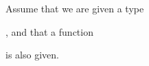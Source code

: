 \documentclass{article}
\begin{document}
Assume that we are given a type
%
\begin{code}[inline=False,hide=true]%
%
\>[2]\AgdaSpace{}%
\AgdaModule{\AgdaUnderscore{}}\AgdaSpace{}%
\AgdaSymbol{(}\<%
\end{code}
\begin{code}[hide,inline,hide=false]%
\>[2][@{}l@{\AgdaIndent{1}}]%
\>[4]\AgdaSpace{}%
\AgdaSymbol{:}\AgdaSpace{}%
\<%
\end{code}
\begin{code}[hide=false,hide=True]%
%
\>[4]\AgdaSymbol{)}\AgdaSpace{}%
\AgdaSymbol{(}\<%
\end{code}
%
,
and that a function
%
\begin{code}[inline*]%
%
\>[4]\AgdaSpace{}%
\AgdaSymbol{:}\AgdaSpace{}%
\AgdaSpace{}%
\AgdaSpace{}%
\AgdaSpace{}%
\AgdaSpace{}%
\AgdaSpace{}%
\AgdaSpace{}%
\<%
\end{code}
\begin{code}[hide]%
%
\>[4]\AgdaSymbol{)}\AgdaSpace{}%
\<%
\end{code}
%
is also given.
\end{document}
